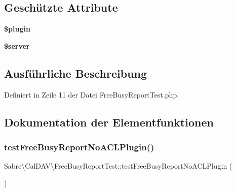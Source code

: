 \subsection*{Geschützte Attribute}
\begin{DoxyCompactItemize}
\item 
\mbox{\label{class_sabre_1_1_cal_d_a_v_1_1_free_busy_report_test_ac5c85726ce5e083f57a568b3549e12a9}} 
{\bfseries \$plugin}
\item 
\mbox{\label{class_sabre_1_1_cal_d_a_v_1_1_free_busy_report_test_aa69ae3631588d05e70c191675e24eb8e}} 
{\bfseries \$server}
\end{DoxyCompactItemize}


\subsection{Ausführliche Beschreibung}


Definiert in Zeile 11 der Datei Free\+Busy\+Report\+Test.\+php.



\subsection{Dokumentation der Elementfunktionen}
\mbox{\label{class_sabre_1_1_cal_d_a_v_1_1_free_busy_report_test_a95944dbc3fc3a9980638ae843117c0d4}} 
\subsubsection{\texorpdfstring{test\+Free\+Busy\+Report\+No\+A\+C\+L\+Plugin()}{testFreeBusyReportNoACLPlugin()}}
{\footnotesize\ttfamily Sabre\textbackslash{}\+Cal\+D\+A\+V\textbackslash{}\+Free\+Busy\+Report\+Test\+::test\+Free\+Busy\+Report\+No\+A\+C\+L\+Plugin (\begin{DoxyParamCaption}{ }\end{DoxyParamCaption})}

